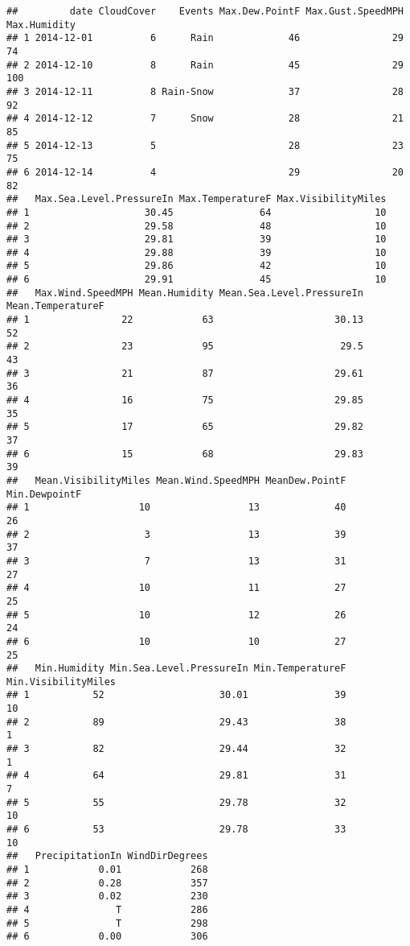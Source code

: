 \documentclass[
]{article}
\begin{document}
\begin{verbatim}
##         date CloudCover    Events Max.Dew.PointF Max.Gust.SpeedMPH Max.Humidity
## 1 2014-12-01          6      Rain             46                29           74
## 2 2014-12-10          8      Rain             45                29          100
## 3 2014-12-11          8 Rain-Snow             37                28           92
## 4 2014-12-12          7      Snow             28                21           85
## 5 2014-12-13          5                       28                23           75
## 6 2014-12-14          4                       29                20           82
##   Max.Sea.Level.PressureIn Max.TemperatureF Max.VisibilityMiles
## 1                    30.45               64                  10
## 2                    29.58               48                  10
## 3                    29.81               39                  10
## 4                    29.88               39                  10
## 5                    29.86               42                  10
## 6                    29.91               45                  10
##   Max.Wind.SpeedMPH Mean.Humidity Mean.Sea.Level.PressureIn Mean.TemperatureF
## 1                22            63                     30.13                52
## 2                23            95                      29.5                43
## 3                21            87                     29.61                36
## 4                16            75                     29.85                35
## 5                17            65                     29.82                37
## 6                15            68                     29.83                39
##   Mean.VisibilityMiles Mean.Wind.SpeedMPH MeanDew.PointF Min.DewpointF
## 1                   10                 13             40            26
## 2                    3                 13             39            37
## 3                    7                 13             31            27
## 4                   10                 11             27            25
## 5                   10                 12             26            24
## 6                   10                 10             27            25
##   Min.Humidity Min.Sea.Level.PressureIn Min.TemperatureF Min.VisibilityMiles
## 1           52                    30.01               39                  10
## 2           89                    29.43               38                   1
## 3           82                    29.44               32                   1
## 4           64                    29.81               31                   7
## 5           55                    29.78               32                  10
## 6           53                    29.78               33                  10
##   PrecipitationIn WindDirDegrees
## 1            0.01            268
## 2            0.28            357
## 3            0.02            230
## 4               T            286
## 5               T            298
## 6            0.00            306
\end{verbatim}
\end{document}
